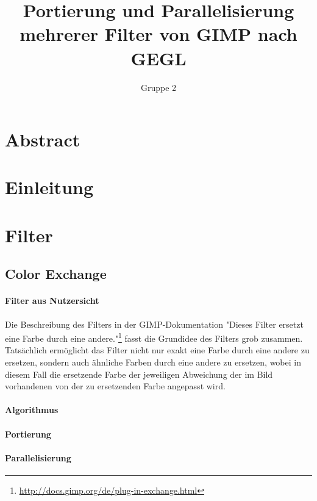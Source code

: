 \documentclass[10pt,a4paper,draft]{article}
\begin{document}
\author{Gruppe 2}
\title{Portierung und Parallelisierung mehrerer Filter von GIMP nach GEGL}
\maketitle

\section*{Abstract}

\section{Einleitung}

\section{Filter}
\subsection{Color Exchange}
\paragraph{Filter aus Nutzersicht}
Die Beschreibung des Filters in der GIMP-Dokumentation "Dieses Filter ersetzt eine Farbe durch eine andere."\footnote{\url{http://docs.gimp.org/de/plug-in-exchange.html}} fasst die Grundidee des Filters grob zusammen. Tatsächlich ermöglicht das Filter nicht nur exakt eine Farbe durch eine andere zu ersetzen, sondern auch ähnliche Farben durch eine andere zu ersetzen, wobei in diesem Fall die ersetzende Farbe der jeweiligen Abweichung der im Bild vorhandenen von der zu ersetzenden Farbe angepasst wird.
\paragraph{Algorithmus} 
\paragraph{Portierung}
\paragraph{Parallelisierung}
\end{document}
